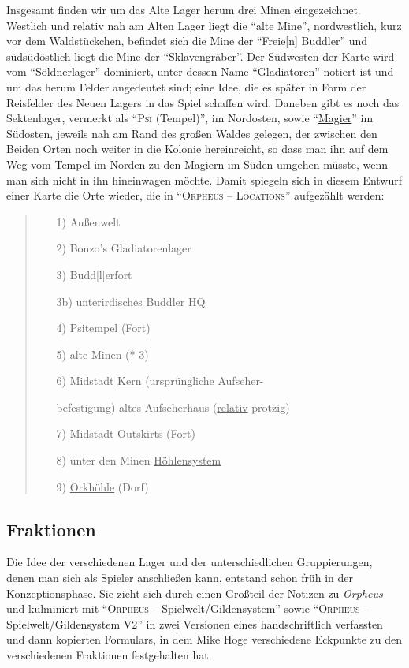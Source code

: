 \documentclass[a5paper,pagesize,numbers=noenddot]{scrbook}
\begin{document}
Insgesamt finden wir um das Alte Lager herum drei Minen eingezeichnet.
Westlich und relativ nah am Alten Lager liegt die \enquote{alte Mine}, nordwestlich, kurz vor dem Waldstückchen, befindet sich die Mine der \enquote{Freie[n] Buddler} und südsüdöstlich liegt die Mine der \enquote{\uline{Sklavengräber}}.
Der Südwesten der Karte wird vom \enquote{Söldnerlager} dominiert, unter dessen Name \enquote{\uline{Gladiatoren}} notiert ist und um das herum Felder angedeutet sind; eine Idee, die es später in Form der Reisfelder des Neuen Lagers in das Spiel schaffen wird.
Daneben gibt es noch das Sektenlager, vermerkt als \enquote{\textsc{Psi} (Tempel)}, im Nordosten, sowie \enquote{\uline{Magier}} im Südosten, jeweils nah am Rand des großen Waldes gelegen, der zwischen den Beiden Orten noch weiter in die Kolonie hereinreicht, so dass man ihn auf dem Weg vom Tempel im Norden zu den Magiern im Süden umgehen müsste, wenn man sich nicht in ihn hineinwagen möchte.
Damit spiegeln sich in diesem Entwurf einer Karte die Orte wieder, die in \enquote{\textsc{Orpheus -- Locations}} aufgezählt werden:

\begin{quote}
   \begin{itemize}
      \item[1)] Außenwelt
      \item[2)] Bonzo's Gladiatorenlager
      \item[3)] Budd[l]erfort
      \item[3b)] unterirdisches Buddler HQ
      \item[4)] Psitempel (Fort)
      \item[5)] alte Minen (* 3)
      \item[6)] Midstadt \uline{Kern} (ursprüngliche Aufseher-
      \item[] befestigung) altes Aufseherhaus (\uline{relativ} protzig)
      \item[7)] Midstadt Outskirts (Fort)
      \item[8)] unter den Minen \uline{Höhlensystem}
      \item[9)] \uline{Orkhöhle} (Dorf)
   \end{itemize}
\end{quote}


\subsection{Fraktionen}\label{sec:orpheus_welt_fraktionen}
Die Idee der verschiedenen Lager und der unterschiedlichen Gruppierungen, denen man sich als Spieler anschließen kann, entstand schon früh in der Konzeptionsphase.
Sie zieht sich durch einen Großteil der Notizen zu \textit{Orpheus} und kulminiert mit \enquote{\textsc{Orpheus} -- Spielwelt/Gildensystem} sowie \enquote{\textsc{Orpheus} -- Spielwelt/Gildensystem V2} in zwei Versionen eines handschriftlich verfassten und dann kopierten Formulars, in dem Mike Hoge verschiedene Eckpunkte zu den verschiedenen Fraktionen festgehalten hat.
\end{document}
